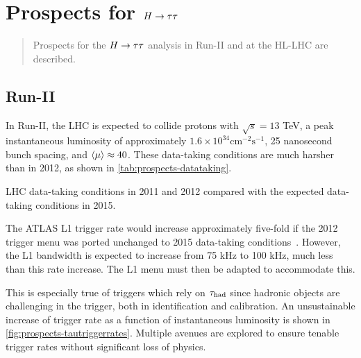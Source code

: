 \chapter[Prospects for $\Htautau$][Prospects for $\Htautau$]{Prospects for $\Htautau$}
\label{chap:prospects}

\begin{quote}
Prospects for the $\Htautau$ analysis in Run-II and at the HL-LHC are described.
\end{quote}

\section{Run-II}
\label{sec:prospects-run2}

In Run-II, the LHC is expected to collide protons with $\sqrt{s} = 13$ TeV, a peak instantaneous luminosity of approximately $1.6\times 10^{34} \text{cm}^{-2} \text{s}^{-1}$, 25 nanosecond bunch spacing, and $\langle\mu\rangle\approx 40$. These data-taking conditions are much harsher than in 2012, as shown in \cref{tab:prospects-datataking}.

\begin{table}[bp] 
  \centering
  \renewcommand{\arraystretch}{1.4}
  \caption{LHC data-taking conditions in 2011 and 2012 compared with the expected data-taking conditions in 2015.}
  
  \label{tab:prospects-datataking}
\end{table}

The ATLAS L1 trigger rate would increase approximately five-fold if the 2012 trigger menu was ported unchanged to 2015 data-taking conditions~\cite{ATL-COM-DAQ-2014-054}. However, the L1 bandwidth is expected to increase from 75 kHz to 100 kHz, much less than this rate increase. The L1 menu must then be adapted to accommodate this.

This is especially true of triggers which rely on $\tau_\text{had}$ since hadronic objects are challenging in the trigger, both in identification and calibration. An unsustainable increase of trigger rate as a function of instantaneous luminosity is shown in \cref{fig:prospects-tautriggerrates}. Multiple avenues are explored to ensure tenable trigger rates without significant loss of physics.

